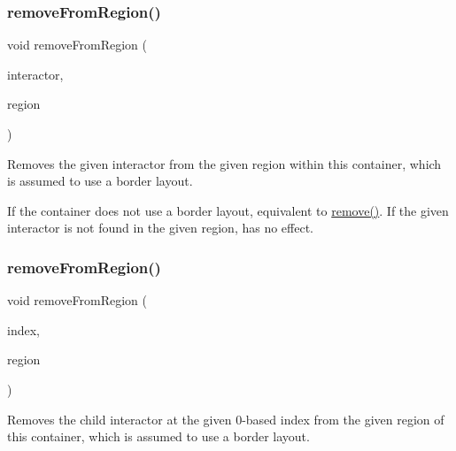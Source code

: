 \subsubsection{\texorpdfstring{remove\+From\+Region()}{removeFromRegion()}\hspace{0.1cm}{\footnotesize\ttfamily [4/6]}}
{\footnotesize\ttfamily void remove\+From\+Region (\begin{DoxyParamCaption}\item[{\mbox{\hyperlink{classsgl_1_1GInteractor}{G\+Interactor}} \&}]{interactor,  }\item[{const std\+::string \&}]{region }\end{DoxyParamCaption})\hspace{0.3cm}{\ttfamily [virtual]}}



Removes the given interactor from the given region within this container, which is assumed to use a border layout. 

If the container does not use a border layout, equivalent to \mbox{\hyperlink{classsgl_1_1GContainer_a1c12b1fde5c2ef10d79d4ee51e670efa}{remove()}}. If the given interactor is not found in the given region, has no effect. \mbox{\label{classsgl_1_1GContainer_a15e3a1d3f3abecc00d68d6df2349f360}} 
\subsubsection{\texorpdfstring{remove\+From\+Region()}{removeFromRegion()}\hspace{0.1cm}{\footnotesize\ttfamily [5/6]}}
{\footnotesize\ttfamily void remove\+From\+Region (\begin{DoxyParamCaption}\item[{int}]{index,  }\item[{\mbox{\hyperlink{classsgl_1_1GContainer_a81a01a86de31071a92e6cce0bab9bc4b}{Region}}}]{region }\end{DoxyParamCaption})\hspace{0.3cm}{\ttfamily [virtual]}}



Removes the child interactor at the given 0-\/based index from the given region of this container, which is assumed to use a border layout. 

